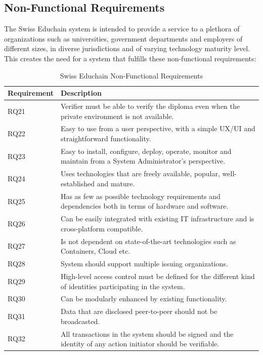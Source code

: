 \subsection{Non-Functional Requirements} \label{ssec:nonfunc-reqs}

The Swiss Educhain system is intended to provide a service to a plethora of organizations such as universities, government departments and employers of different sizes, in diverse jurisdictions and of varying technology maturity level. This creates the need for a system that fulfills these non-functional requirements:

\newpage

\begin{table}[H]
	\centering
	\begin{tabularx}{\textwidth}{| l | X |}
		\hline
		\textbf{Requirement}	& \textbf{Description} \\ \hline
		RQ21 & Verifier must be able to verify the diploma even when the private environment is not available. \\ \hline
		RQ22 & Easy to use from a user perspective, with a simple UX/UI and straightforward functionality. \\ \hline
		RQ23 & Easy to install, configure, deploy, operate, monitor and maintain from a System Administrator's perspective. \\ \hline
		RQ24 & Uses technologies that are freely available, popular, well-established and mature. \\ \hline
		RQ25 & Has as few as possible technology requirements and dependencies both in terms of hardware and software. \\ \hline
		RQ26 & Can be easily integrated with existing IT infrastructure and is cross-platform compatible. \\ \hline
		RQ27 & Is not dependent on state-of-the-art technologies such as Containers, Cloud etc. \\ \hline
		RQ28 & System should support multiple issuing organizations. \\ \hline
		RQ29 & High-level access control must be defined for the different kind of identities participating in the system. %
		\\ \hline
		RQ30 & Can be modularly enhanced by existing functionality. \\ \hline
		RQ31 & Data that are disclosed peer-to-peer should not be broadcasted. \\ \hline
		RQ32 & All transactions in the system should be signed and the identity of any action initiator should be verifiable. \\ \hline
		
		
	\end{tabularx}
	\caption{Swiss Educhain Non-Functional Requirements}
	\label{tab:non-func-reqs}
\end{table}

